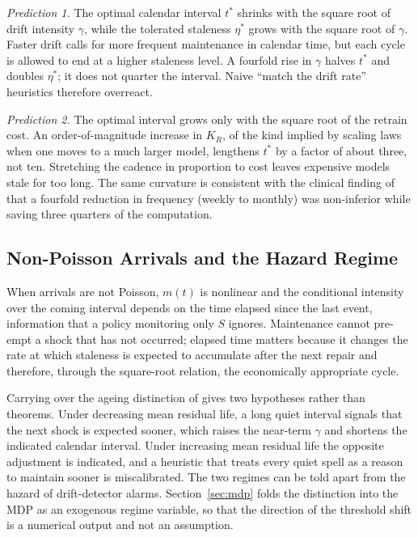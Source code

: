 \documentclass[journal]{IEEEtran}
\begin{document}
\emph{Prediction 1.} The optimal calendar interval $t^\ast$ shrinks with the square root of drift intensity $\gamma$, while the tolerated staleness $\eta^\ast$ grows with the square root of $\gamma$. Faster drift calls for more frequent maintenance in calendar time, but each cycle is allowed to end at a higher staleness level. A fourfold rise in $\gamma$ halves $t^\ast$ and doubles $\eta^\ast$; it does not quarter the interval. Naive ``match the drift rate'' heuristics therefore overreact.

\emph{Prediction 2.} The optimal interval grows only with the square root of the retrain cost. An order-of-magnitude increase in $K_R$, of the kind implied by scaling laws when one moves to a much larger model, lengthens $t^\ast$ by a factor of about three, not ten. Stretching the cadence in proportion to cost leaves expensive models stale for too long. The same curvature is consistent with the clinical finding of \cite{williams2026} that a fourfold reduction in frequency (weekly to monthly) was non-inferior while saving three quarters of the computation.

\subsection{Non-Poisson Arrivals and the Hazard Regime}
When arrivals are not Poisson, $m(t)$ is nonlinear and the conditional intensity over the coming interval depends on the time elapsed since the last event, information that a policy monitoring only $S$ ignores. Maintenance cannot pre-empt a shock that has not occurred; elapsed time matters because it changes the rate at which staleness is expected to accumulate after the next repair and therefore, through the square-root relation, the economically appropriate cycle.

Carrying over the ageing distinction of \cite{beytur2025} gives two hypotheses rather than theorems. Under decreasing mean residual life, a long quiet interval signals that the next shock is expected sooner, which raises the near-term $\gamma$ and shortens the indicated calendar interval. Under increasing mean residual life the opposite adjustment is indicated, and a heuristic that treats every quiet spell as a reason to maintain sooner is miscalibrated. The two regimes can be told apart from the hazard of drift-detector alarms. Section~\ref{sec:mdp} folds the distinction into the MDP as an exogenous regime variable, so that the direction of the threshold shift is a numerical output and not an assumption.
\end{document}
